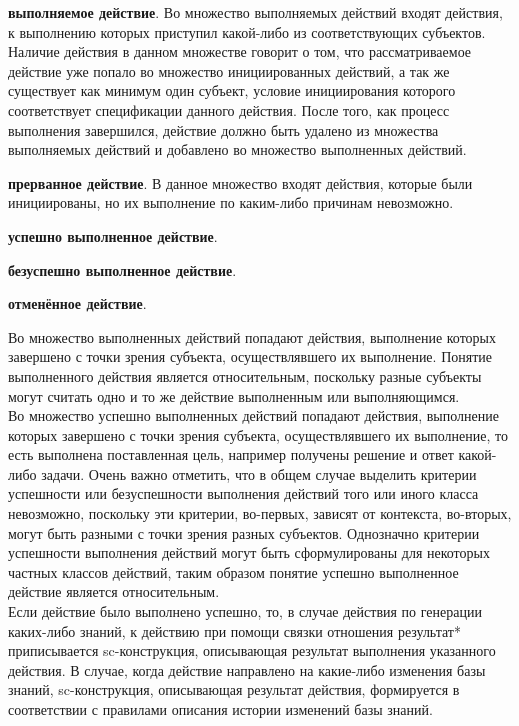 \begin{frame}{}
    \begin{textitemize}
        \item \textbf{выполняемое действие}. Во множество выполняемых действий входят действия, к выполнению которых приступил какой-либо из соответствующих субъектов. Наличие действия в данном множестве говорит о том, что рассматриваемое действие уже попало во множество инициированных действий, а так же существует как минимум один субъект, условие инициирования которого соответствует спецификации данного действия. После того, как процесс выполнения завершился, действие должно быть удалено из множества выполняемых действий и добавлено во множество выполненных действий. 
        \item \textbf{прерванное действие}. В данное множество входят действия, которые были инициированы, но их выполнение по каким-либо причинам невозможно.
        \item \textbf{успешно выполненное действие}.
        \item \textbf{безуспешно выполненное действие}.
        \item \textbf{отменённое действие}.
    \end{textitemize}
\end{frame}
\begin{frame}{}
    Во множество выполненных действий попадают действия, выполнение которых завершено с точки зрения субъекта, осуществлявшего их выполнение. Понятие выполненного действия является относительным, поскольку разные субъекты могут считать одно и то же действие выполненным или выполняющимся.\\
    Во множество успешно выполненных действий попадают действия, выполнение которых завершено с точки зрения субъекта, осуществлявшего их выполнение, то есть выполнена поставленная цель, например получены решение и ответ какой-либо задачи. Очень важно отметить, что в общем случае выделить критерии успешности или безуспешности выполнения действий того или иного класса невозможно, поскольку эти критерии, во-первых, зависят от контекста, во-вторых, могут быть разными с точки зрения разных субъектов. Однозначно критерии успешности выполнения действий могут быть сформулированы для некоторых частных классов действий, таким образом понятие успешно выполненное действие является относительным.\\
    Если действие было выполнено успешно, то, в случае действия по генерации каких-либо знаний, к действию при помощи связки отношения результат* приписывается sc-конструкция, описывающая результат выполнения указанного действия. В случае, когда действие направлено на какие-либо изменения базы знаний, sc-конструкция, описывающая результат действия, формируется в соответствии с правилами описания истории изменений базы знаний.
\end{frame}
